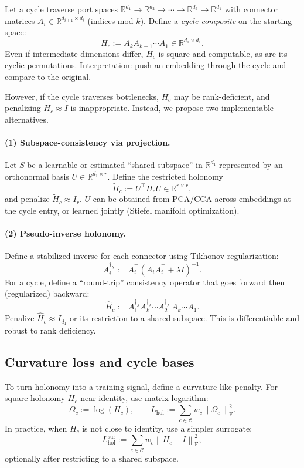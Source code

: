 \documentclass[11pt]{article}
\theoremstyle{definition}
\theoremstyle{plain}
\theoremstyle{remark}
\newcommand{\R}{\mathbb{R}}
\newcommand{\Frob}[1]{\left\lVert #1 \right\rVert_{\mathrm{F}}}
\newcommand{\mc}[1]{\mathcal{#1}}
\begin{document}
Let a cycle traverse port spaces $\R^{d_1}\to\R^{d_2}\to\cdots\to\R^{d_k}\to\R^{d_1}$ with connector matrices
$A_i\in\R^{d_{i+1}\times d_i}$ (indices mod $k$).
Define a \emph{cycle composite} on the starting space:
\[
H_c := A_k A_{k-1}\cdots A_1 \in \R^{d_1\times d_1}.
\]
Even if intermediate dimensions differ, $H_c$ is square and computable, as are its cyclic permutations. Interpretation: push an embedding through the cycle and compare to the original.

However, if the cycle traverses bottlenecks, $H_c$ may be rank-deficient, and penalizing $H_c\approx I$ is inappropriate.
Instead, we propose two implementable alternatives.

\paragraph{(1) Subspace-consistency via projection.}
Let $S$ be a learnable or estimated ``shared subspace'' in $\R^{d_1}$ represented by an orthonormal basis $U\in\R^{d_1\times r}$.
Define the restricted holonomy
\[
\tilde H_c := U^\top H_c U \in \R^{r\times r},
\]
and penalize $\tilde H_c\approx I_r$.
$U$ can be obtained from PCA/CCA across embeddings at the cycle entry, or learned jointly (Stiefel manifold optimization).

\paragraph{(2) Pseudo-inverse holonomy.}
Define a stabilized inverse for each connector using Tikhonov regularization:
\[
A_i^{\dagger_\lambda} := A_i^\top (A_i A_i^\top + \lambda I)^{-1}.
\]
For a cycle, define a ``round-trip'' consistency operator that goes forward then (regularized) backward:
\[
\hat H_c := A_1^{\dagger_\lambda} A_k^{\dagger_\lambda}\cdots A_2^{\dagger_\lambda}\, A_k\cdots A_1.
\]
Penalize $\hat H_c\approx I_{d_1}$ or its restriction to a shared subspace.
This is differentiable and robust to rank deficiency.

\subsection{Curvature loss and cycle bases}
To turn holonomy into a training signal, define a curvature-like penalty.
For square holonomy $H_c$ near identity, use matrix logarithm:
\[
\Omega_c := \log(H_c),\qquad L_{\mathrm{hol}}:=\sum_{c\in\mc{C}} w_c \Frob{\Omega_c}^2.
\]
In practice, when $H_c$ is not close to identity, use a simpler surrogate:
\[
L_{\mathrm{hol}}^{\mathrm{sur}} := \sum_{c\in\mc{C}} w_c \Frob{H_c - I}^2,
\]
optionally after restricting to a shared subspace.
\end{document}
